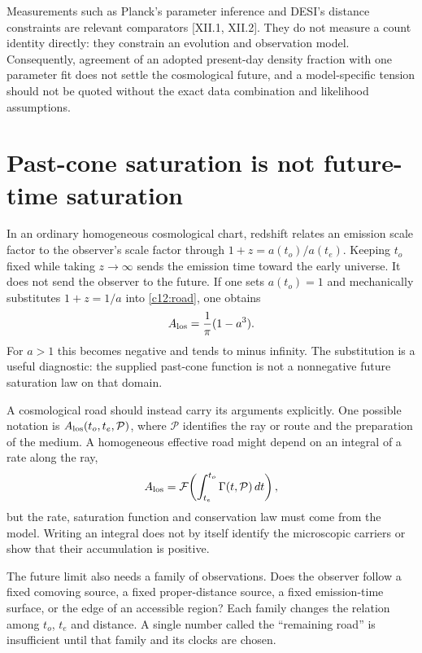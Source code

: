 Measurements such as Planck's parameter inference and DESI's distance constraints are relevant comparators [XII.1, XII.2]. They do not measure a count identity directly: they constrain an evolution and observation model. Consequently, agreement of an adopted present-day density fraction with one parameter fit does not settle the cosmological future, and a model-specific tension should not be quoted without the exact data combination and likelihood assumptions.

\section{Past-cone saturation is not future-time saturation}
In an ordinary homogeneous cosmological chart, redshift relates an emission scale factor to the observer's scale factor through $1+z=a(t_o)/a(t_e)$. Keeping $t_o$ fixed while taking $z\to\infty$ sends the emission time toward the early universe. It does not send the observer to the future. If one sets $a(t_o)=1$ and mechanically substitutes $1+z=1/a$ into \eqref{c12:road}, one obtains
\begin{equation}
 A_{\rm los}=\frac1\pi(1-a^3).
 \label{c12:badextension}
\end{equation}
For $a>1$ this becomes negative and tends to minus infinity. The substitution is a useful diagnostic: the supplied past-cone function is not a nonnegative future saturation law on that domain.

A cosmological road should instead carry its arguments explicitly. One possible notation is $A_{\rm los}(t_o,t_e,\mathcal P)$, where $\mathcal P$ identifies the ray or route and the preparation of the medium. A homogeneous effective road might depend on an integral of a rate along the ray,
\begin{equation}
 A_{\rm los}=\mathcal F\!\left(\int_{t_e}^{t_o}
                        \Gamma(t,\mathcal P)\,dt\right),
 \label{c12:roadfunctional}
\end{equation}
but the rate, saturation function and conservation law must come from the model. Writing an integral does not by itself identify the microscopic carriers or show that their accumulation is positive.

The future limit also needs a family of observations. Does the observer follow a fixed comoving source, a fixed proper-distance source, a fixed emission-time surface, or the edge of an accessible region? Each family changes the relation among $t_o$, $t_e$ and distance. A single number called the ``remaining road'' is insufficient until that family and its clocks are chosen.

